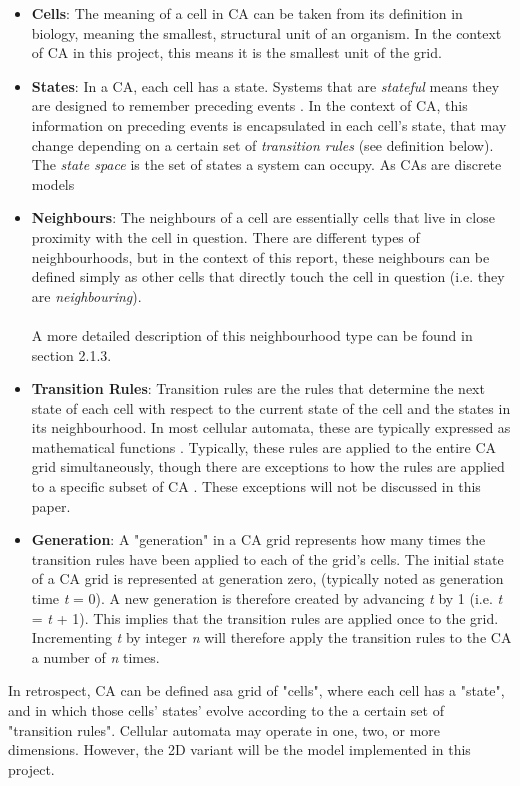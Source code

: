 \begin{itemize}
    \item \textbf{Cells}: The meaning of a cell in CA can be taken from its definition in biology, meaning the smallest, structural unit of an organism. In the context of CA in this project, this means it is the smallest unit of the grid. 
    \item \textbf{States}: In a CA, each cell has a state. Systems that  are \textit{stateful} means they are designed to remember preceding events \cite{harris2010digital}. In the context of CA, this information on preceding events is encapsulated in each cell's state, that may change depending on a certain set of \textit{transition rules} (see definition below). The \textit{state space} \label{state_space} is the set of states a system can occupy. As CAs are discrete models \cite{wolfram} 
    \item \textbf{Neighbours}: The neighbours of a cell are essentially cells that live in close proximity with the cell in question. There are different types of neighbourhoods, but in the context of this report, these neighbours can be defined simply as other cells that directly touch the cell in question (i.e. they are \textit{neighbouring}).
    \\ \\
    A more detailed description of this neighbourhood type can be found in section 2.1.3.
    \item \textbf{Transition Rules}: Transition rules are the rules that determine the next state of each cell with respect to the current state of the cell and the states in its neighbourhood. In most cellular automata, these are typically expressed as mathematical functions \cite{toffoli1987cellular}. Typically, these rules are applied to the entire CA grid simultaneously, though there are exceptions to how the rules are applied to a specific subset of CA \cite{schiff2011cellular}. These exceptions will not be discussed in this paper.
    \item \textbf{Generation}: A "generation" in a CA grid represents how many times the transition rules have been applied to each of the grid's cells. The initial state of a CA grid is represented at generation zero, (typically noted as generation time \textit{t} = 0). A new generation is therefore created by advancing \textit{t} by 1 (i.e. \textit{t} = \textit{t} + 1). This implies that the transition rules are applied once to the grid. Incrementing \textit{t} by integer \textit{n} will therefore apply the transition rules to the CA a number of \textit{n} times.
\end{itemize}
In retrospect, CA can be defined asa grid of "cells", where each cell has a "state", and in which those cells' states' evolve according to the a certain set of "transition rules". Cellular automata may operate in one, two, or more dimensions. However, the 2D variant will be the model implemented in this project. 

